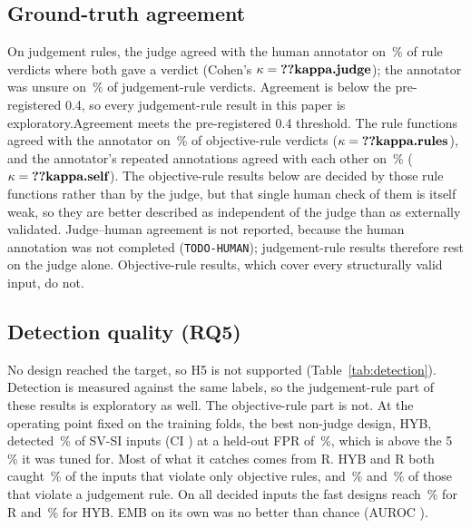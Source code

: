 \documentclass[conference]{IEEEtran}
\begin{document}
\subsection{Ground-truth agreement}
\ifhumanlabels On judgement rules, the judge agreed with the human annotator on \,\% of
 rule verdicts where both gave a verdict (Cohen's $\kappa=\R{kappa.judge}$); the annotator
was unsure on \,\% of judgement-rule verdicts. \ifjudgeweak Agreement is below the
pre-registered 0.4, so every judgement-rule result in this paper is exploratory.\else Agreement meets
the pre-registered 0.4 threshold.\fi{} The rule functions agreed with the annotator on
\,\% of objective-rule verdicts ($\kappa=\R{kappa.rules}$), and the annotator's
repeated annotations agreed with each other on \,\% ($\kappa=\R{kappa.self}$). The
objective-rule results below are decided by those rule functions rather than by the judge, but that
single human check of them is itself weak, so they are better described as independent of the judge
than as externally validated.\else
Judge--human agreement is not reported, because the human annotation was not completed
(\texttt{TODO-HUMAN}); judgement-rule results therefore rest on the judge alone. Objective-rule
results, which cover every structurally valid input, do not.\fi

\subsection{Detection quality (RQ5)}

No design reached the target, so H5 is not supported (Table~\ref{tab:detection}).\ifjudgeweak{}
Detection is measured against the same labels, so the judgement-rule part of these results is
exploratory as well. The objective-rule part is not.\fi{} At the operating point fixed on the training
folds, the best non-judge design, HYB, detected \,\% of SV-SI inputs (CI
) at a held-out FPR of \,\%, which is above the 5\,\% it was tuned for. Most
of what it catches comes from R. HYB and R both caught \,\% of the inputs that violate
only objective rules, and \,\% and \,\% of those that violate a judgement
rule. On all decided inputs the fast designs reach \,\% for R and
\,\% for HYB. EMB on its own was no better than chance (AUROC
).
\end{document}

